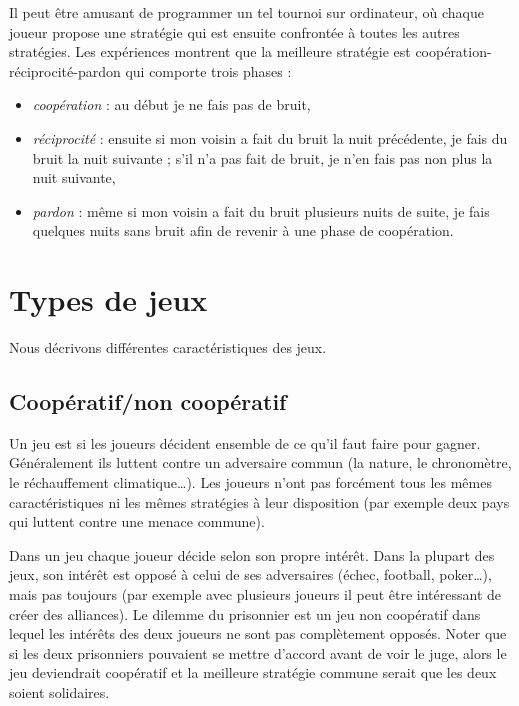 \documentclass[11pt,class=report,crop=false]{standalone}
\begin{document}
Il peut être amusant de programmer un tel tournoi sur ordinateur, où chaque joueur propose une stratégie qui est ensuite confrontée à toutes les autres stratégies.
Les expériences montrent que la meilleure stratégie est \og{}coopération-réciprocité-pardon\fg{} qui comporte trois phases :
\begin{itemize}
	\item \emph{coopération} : au début je ne fais pas de bruit,
	\item \emph{réciprocité} : ensuite si mon voisin a fait du bruit la nuit précédente, je fais du bruit la nuit suivante ; s'il n'a pas fait de bruit, je n'en fais pas non plus la nuit suivante,
	\item \emph{pardon} : même si mon voisin a fait du bruit plusieurs nuits de suite, je fais quelques nuits sans bruit afin de revenir à une phase de coopération.
\end{itemize}	


	
\section{Types de jeux}

Nous décrivons différentes caractéristiques des jeux.

\subsection{Coopératif/non coopératif}

Un jeu est  si les joueurs décident ensemble de ce qu'il faut faire pour gagner. Généralement ils luttent contre un adversaire commun (la nature, le chronomètre, le réchauffement climatique\ldots). Les joueurs n'ont pas forcément tous les mêmes caractéristiques ni les mêmes stratégies à leur disposition (par exemple deux pays qui luttent contre une menace commune).

Dans un jeu  chaque joueur décide selon son propre intérêt. Dans la plupart des jeux, son intérêt est opposé à celui de ses adversaires (échec, football, poker\ldots), mais pas toujours (par exemple avec plusieurs joueurs il peut être intéressant de créer des alliances).
Le dilemme du prisonnier est un jeu non coopératif dans lequel les intérêts des deux joueurs ne sont pas complètement opposés.
Noter que si les deux prisonniers pouvaient se mettre d'accord avant de voir le juge, alors le jeu deviendrait coopératif et la meilleure stratégie commune serait que les deux soient solidaires.
\end{document}
